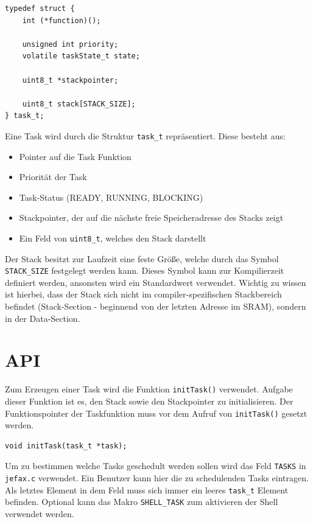 \documentclass[fontsize=12pt, toc=bibliography, notitlepage]{scrreprt}
\begin{document}
\begin{lstlisting}[title=task.h]
typedef struct {
	int (*function)();

	unsigned int priority;
	volatile taskState_t state;

	uint8_t *stackpointer;

	uint8_t stack[STACK_SIZE];
} task_t;
\end{lstlisting}

Eine Task wird durch die Struktur \lstinline$task_t$ repräsentiert. Diese besteht aus:

\begin{itemize}
	\item Pointer auf die Task Funktion
	\item Priorität der Task
	\item Task-Status (READY, RUNNING, BLOCKING)
	\item Stackpointer, der auf die nächste freie Speicheradresse des Stacks zeigt
	\item Ein Feld von \lstinline$uint8_t$, welches den Stack darstellt
\end{itemize}

Der Stack besitzt zur Laufzeit eine feste Größe, welche durch das Symbol \lstinline$STACK_SIZE$ festgelegt werden kann. Dieses Symbol kann zur Kompilierzeit definiert werden, ansonsten wird ein Standardwert verwendet. Wichtig zu wissen ist hierbei, dass der Stack sich nicht im compiler-spezifischen Stackbereich befindet (Stack-Section - beginnend von der letzten Adresse im SRAM), sondern in der Data-Section.

\section{API}
\label{subsec:tasks-api}
Zum Erzeugen einer Task wird die Funktion \lstinline$initTask()$ verwendet. Aufgabe dieser Funktion ist es, den Stack sowie den Stackpointer zu initialisieren. Der Funktionspointer der Taskfunktion muss vor dem Aufruf von \lstinline$initTask()$ gesetzt werden.

\begin{lstlisting}
void initTask(task_t *task);
\end{lstlisting}

Um zu bestimmen welche Tasks geschedult werden sollen wird das Feld \lstinline$TASKS$ in\\ \lstinline$jefax.c$ verwendet. Ein Benutzer kann hier die zu schedulenden Tasks eintragen. Als letztes Element in dem Feld muss sich immer ein leeres \lstinline$task_t$ Element befinden. Optional kann das Makro \lstinline$SHELL_TASK$ zum aktivieren der Shell verwendet werden.
\end{document}
